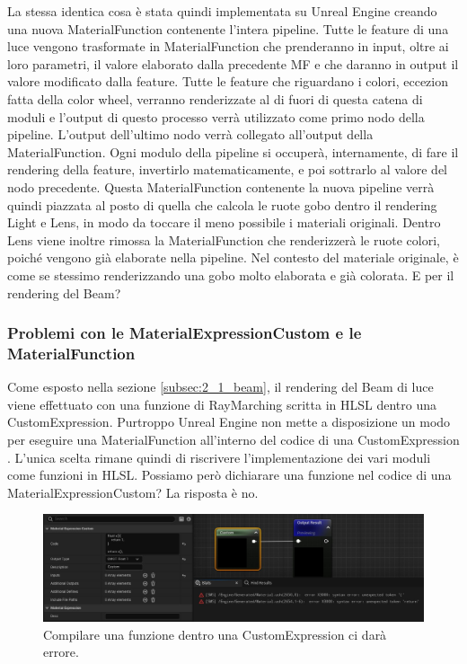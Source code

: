 \documentclass[main.tex]{subfiles}
\begin{document}
\noindent La stessa identica cosa è stata quindi implementata su Unreal Engine creando una nuova MaterialFunction contenente l'intera pipeline. Tutte le feature di una luce vengono trasformate in MaterialFunction che prenderanno in input, oltre ai loro parametri, il valore elaborato dalla precedente MF e che daranno in output il valore modificato dalla feature. Tutte le feature che riguardano i colori, eccezion fatta della color wheel, verranno renderizzate al di fuori di questa catena di moduli e l'output di questo processo verrà utilizzato come primo nodo della pipeline. L'output dell'ultimo nodo verrà collegato all'output della MaterialFunction. Ogni modulo della pipeline si occuperà, internamente, di fare il rendering della feature, invertirlo matematicamente, e poi sottrarlo al valore del nodo precedente. \newline
Questa MaterialFunction contenente la nuova pipeline verrà quindi piazzata al posto di quella che calcola le ruote gobo dentro il rendering Light e Lens, in modo da toccare il meno possibile i materiali originali. Dentro Lens viene inoltre rimossa la MaterialFunction che renderizzerà le ruote colori, poiché vengono già elaborate nella pipeline. Nel contesto del materiale originale, è come se stessimo renderizzando una gobo molto elaborata e già colorata. \newline
E per il rendering del Beam?

\subsubsection{Problemi con le MaterialExpressionCustom e le MaterialFunction}\label{subsec:2_2_CM-MFproblems}
Come esposto nella sezione \ref{subsec:2_1_beam}, il rendering del Beam di luce viene effettuato con una funzione di RayMarching scritta in HLSL dentro una CustomExpression. Purtroppo Unreal Engine non mette a disposizione un modo  per eseguire una MaterialFunction all'interno del codice di una CustomExpression \cite{customExpressionMaterialFunction}. L'unica scelta rimane quindi di riscrivere l'implementazione dei vari moduli come funzioni in HLSL. Possiamo però dichiarare una funzione nel codice di una MaterialExpressionCustom? La risposta è no.
\begin{figure}[H]
    \centering
    \includegraphics[width=1\linewidth]{img/renderingPipeline/meCustomNoFunc.jpg}
    \caption{Compilare una funzione dentro una CustomExpression ci darà errore.}
    \label{fig:2_funcCompileError}
\end{figure}
\end{document}
